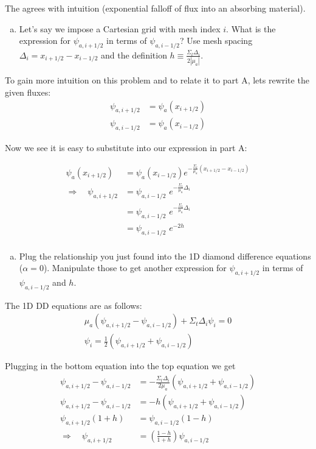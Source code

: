 \documentclass[10pt]{article}
\begin{document}
The agrees with intuition (exponential falloff of flux into an absorbing material).

%
%
%

\vspace{10pt}
\begin{enumerate}[(b)]
\item Let's say we impose a Cartesian grid with mesh index $i$. What is the expression for $\psi_{a,i+1/2}$ in terms of $\psi_{a,i-1/2}$? Use mesh spacing $\Delta_i = x_{i+1/2} - x_{i-1/2}$ and the definition $h \equiv \frac{\Sigma_t \Delta_i}{2|\mu_a|}$.
\end{enumerate}

To gain more intuition on this problem and to relate it to part A, lets rewrite the given fluxes:
%
\begin{align*}
    \psi_{a,i+1/2} &= \psi_a(x_{i+1/2}) \\
    \psi_{a,i-1/2} &= \psi_a(x_{i-1/2})
\end{align*}

Now we see it is easy to substitute into our expression in part A:

\begin{align*}
     \psi_a(x_{i+1/2}) &= \psi_a(x_{i-1/2})e^{-\frac{\Sigma_t}{\mu_a }(x_{i+1/2} - x_{i-1/2})} \\
     \Rightarrow \quad \psi_{a,i+1/2} &= \psi_{a,i-1/2}\,\,e^{-\frac{\Sigma_t}{\mu_a }\Delta_i} \\
     &= \psi_{a,i-1/2}\,\,e^{-\frac{\Sigma_t}{\mu_a }\Delta_i} \\
     &= \psi_{a,i-1/2}\,\,e^{-2h} \\
\end{align*}

%
%
%

\begin{enumerate}[(c)]
\item Plug the relationship you just found into the 1D diamond difference equations ($\alpha = 0$). Manipulate those to get another expression for
 $\psi_{a,i+1/2}$ in terms of $\psi_{a,i-1/2}$ and $h$.
\end{enumerate}

The 1D DD equations are as follows:
%
\begin{align*}
    \mu_a(\psi_{a,i+1/2} - \psi_{a,i-1/2}) + \Sigma_t \Delta_i \psi_i = 0 \\
    \psi_i = \frac{1}{2}(\psi_{a,i+1/2} + \psi_{a,i-1/2})
\end{align*}

Plugging in the bottom equation into the top equation we get
%
\begin{align*}
    \psi_{a,i+1/2} - \psi_{a,i-1/2} &= -\frac{\Sigma_t \Delta_i}{2\mu_a} (\psi_{a,i+1/2} + \psi_{a,i-1/2}) \\
    \psi_{a,i+1/2} - \psi_{a,i-1/2} &= -h (\psi_{a,i+1/2} + \psi_{a,i-1/2}) \\
    \psi_{a,i+1/2}(1+h) &= \psi_{a,i-1/2}(1-h) \\
    \Rightarrow \quad \psi_{a,i+1/2} &= \left(\frac{1-h}{1+h}\right)\psi_{a,i-1/2}
\end{align*}
\end{document}
